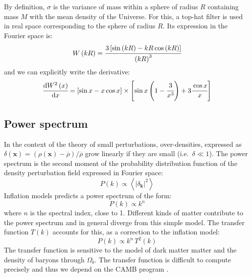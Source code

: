 By definition, $\sigma$ is the variance of mass within a sphere of radius
$R$ containing mass $M$ with the mean density of the Universe. For this, a
top-hat filter is used in real space corresponding to the sphere of radius
$R$. Its expression in the Fourier space is:
%
\begin{equation}
    W \left(kR\right) =
    \cfrac{3\left[\sin\left(kR\right) - kR \cos \left(kR\right)\right]}
    {{\left(kR\right)}^3}
\end{equation}
%
and we can explicitly write the derivative:
%
\begin{equation}
    \cfrac{{\rm{d}} W^2 \left(x\right)}{{\rm{d}} x} = \left[\sin x - x\cos x\right]
    \times \left[\sin x \left(1 - \cfrac{3}{x^3}\right) + 3\cfrac{\cos
    x}{x}\right]
\end{equation}

\subsection{Power spectrum}
\label{sub:power_spectrum}

In the context of the theory of small perturbations, over-densities, expressed
as $\delta \left(\textbf{x}\right) = \left(\rho \left(\textbf{x}\right) -
\overline\rho\right) / \overline\rho$ grow linearly if they are small
(i.e.\ $\delta\ll1$). The power spectrum is the second moment of the
probability distribution function of the density perturbation field
expressed in Fourier space:
%
\begin{equation}
    P \left(k\right) \propto
    \left\langle{\left|\delta_\textbf{k}\right|}^2\right\rangle
\end{equation}
%
Inflation models predicts a power spectrum of the form:
%
\begin{equation}
    P \left(k\right) \propto k^n
\end{equation}
%
where $n$ is the spectral index, close to 1. Different kinds of matter
contribute to the power spectrum and in general diverge from this simple model.
The transfer function $T \left(k\right)$ accounts for this, as a correction to
the inflation model:
%
\begin{equation}
    P \left(k\right) \propto k^n\, T^2 \left(k\right)
\end{equation}
%
The transfer function is sensitive to the model of dark matter matter and the
density of baryons through $\Omega_b$. The transfer function is difficult
to compute precisely and thus we depend on the CAMB program \citep{Lewis+00}.

